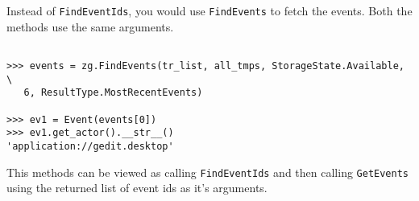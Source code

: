Instead of \texttt{FindEventIds}, you would use \texttt{FindEvents} to fetch 
the events. Both the methods use the same arguments.

\begin{center}
\begin{verbatim}

>>> events = zg.FindEvents(tr_list, all_tmps, StorageState.Available, \
   6, ResultType.MostRecentEvents)

>>> ev1 = Event(events[0])
>>> ev1.get_actor().__str__()
'application://gedit.desktop'

\end{verbatim}
\end{center}

This methods can be viewed as calling \texttt{FindEventIds} and then calling 
\texttt{GetEvents} using the returned list of event ids as it's arguments.